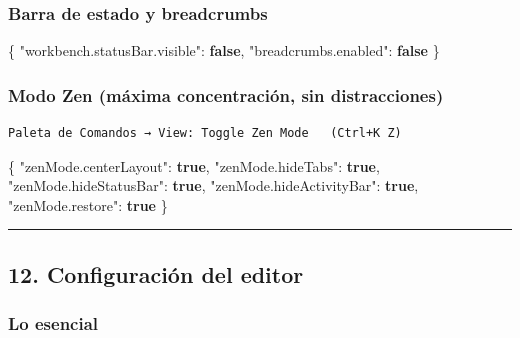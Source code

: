 \documentclass[
  doc,
  floatsintext,
  longtable,
  a4paper,
  nolmodern,
  notxfonts,
  notimes,
  12pt,
  colorlinks=true,linkcolor=blue,citecolor=blue,urlcolor=blue]{apa7}
\newenvironment{Shaded}{\begin{snugshade}}{\end{snugshade}}
\newcommand{\DataTypeTok}[1]{\textcolor[rgb]{0.68,0.00,0.00}{#1}}
\newcommand{\FunctionTok}[1]{\textcolor[rgb]{0.28,0.35,0.67}{#1}}
\newcommand{\KeywordTok}[1]{\textcolor[rgb]{0.00,0.23,0.31}{\textbf{#1}}}
\begin{document}
\subsubsection{Barra de estado y
breadcrumbs}\label{barra-de-estado-y-breadcrumbs}

\begin{Shaded}
\begin{Highlighting}[]
\FunctionTok{\{}
  \DataTypeTok{"workbench.statusBar.visible"}\FunctionTok{:} \KeywordTok{false}\FunctionTok{,}
  \DataTypeTok{"breadcrumbs.enabled"}\FunctionTok{:} \KeywordTok{false}
\FunctionTok{\}}
\end{Highlighting}
\end{Shaded}

\subsubsection{Modo Zen (máxima concentración, sin
distracciones)}\label{modo-zen-muxe1xima-concentraciuxf3n-sin-distracciones}

\begin{verbatim}
Paleta de Comandos → View: Toggle Zen Mode   (Ctrl+K Z)
\end{verbatim}

\begin{Shaded}
\begin{Highlighting}[]
\FunctionTok{\{}
  \DataTypeTok{"zenMode.centerLayout"}\FunctionTok{:} \KeywordTok{true}\FunctionTok{,}
  \DataTypeTok{"zenMode.hideTabs"}\FunctionTok{:} \KeywordTok{true}\FunctionTok{,}
  \DataTypeTok{"zenMode.hideStatusBar"}\FunctionTok{:} \KeywordTok{true}\FunctionTok{,}
  \DataTypeTok{"zenMode.hideActivityBar"}\FunctionTok{:} \KeywordTok{true}\FunctionTok{,}
  \DataTypeTok{"zenMode.restore"}\FunctionTok{:} \KeywordTok{true}
\FunctionTok{\}}
\end{Highlighting}
\end{Shaded}

\begin{center}\rule{0.5\linewidth}{0.5pt}\end{center}

\subsection{12. Configuración del
editor}\label{configuraciuxf3n-del-editor}

\subsubsection{Lo esencial}\label{lo-esencial}
\end{document}
